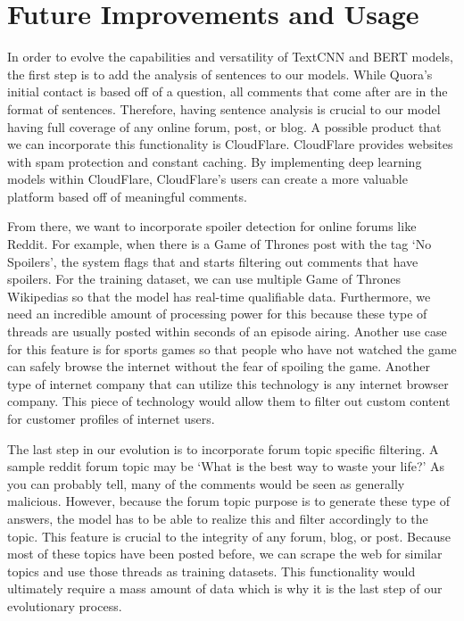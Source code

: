 \documentclass{article}
\begin{document}
\section{Future Improvements and Usage}
In order to evolve the capabilities and versatility of TextCNN and BERT models, the first step is to add the analysis of sentences to our models. While Quora’s initial contact is based off of a question, all comments that come after are in the format of sentences. Therefore, having sentence analysis is crucial to our model having full coverage of any online forum, post, or blog. A possible product that we can incorporate this functionality is CloudFlare. CloudFlare provides websites with spam protection and constant caching. By implementing deep learning models within CloudFlare, CloudFlare’s users can create a more valuable platform based off of meaningful comments. 

From there, we want to incorporate spoiler detection for online forums like Reddit. For example, when there is a Game of Thrones post with the tag ‘No Spoilers’, the system flags that and starts filtering out comments that have spoilers. For the training dataset, we can use multiple Game of Thrones Wikipedias so that the model has real-time qualifiable data. Furthermore, we need an incredible amount of processing power for this because these type of threads are usually posted within seconds of an episode airing. Another use case for this feature is for sports games so that people who have not watched the game can safely browse the internet without the fear of spoiling the game. Another type of internet company that can utilize this technology is any internet browser company. This piece of technology would allow them to filter out custom content for customer profiles of internet users.

The last step in our evolution is to incorporate forum topic specific filtering. A sample reddit forum topic may be ‘What is the best way to waste your life?’ As you can probably tell, many of the comments would be seen as generally malicious. However, because the forum topic purpose is to generate these type of answers, the model has to be able to realize this and filter accordingly to the topic. This feature is crucial to the integrity of any forum, blog, or post. Because most of these topics have been posted before, we can scrape the web for similar topics and use those threads as training datasets. This functionality would ultimately require a mass amount of data which is why it is the last step of our evolutionary process. 
\end{document}
